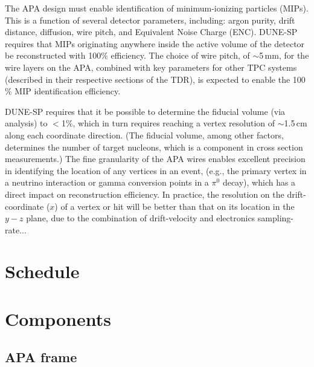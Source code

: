 The APA design must enable identification of minimum-ionizing particles (MIPs). This is a function of several detector parameters, including: argon purity, drift distance, diffusion, wire pitch, and Equivalent Noise Charge (ENC).  DUNE-SP requires that MIPs originating anywhere inside the active volume of the detector be reconstructed with 100$\%$ efficiency.   The choice of wire pitch, of $\sim$5\,mm, for the wire layers on the APA, combined with key parameters for other TPC systems (described in their respective sections of the TDR), is expected to enable the 100$\%$ MIP identification efficiency.

DUNE-SP requires that it be possible to determine the fiducial volume (via analysis) to $<$1$\%$, which in turn requires reaching a vertex resolution of $\sim$1.5\,cm along each coordinate direction. (The fiducial volume, among other factors, determines the number of target nucleons, which is a component in cross section measurements.) 
The fine granularity of the APA wires enables excellent precision in identifying the location of any vertices in an event, (e.g., the primary vertex in a neutrino interaction or gamma conversion points in a $\pi^{0}$ decay), which has a direct impact on reconstruction efficiency.
In practice, the resolution on the drift-coordinate ($x$) of a vertex or hit will be better than that on its location in the $y-z$ plane, due to the combination of drift-velocity and electronics sampling-rate...

\section{Schedule}
\label{apa:schedule}



\section{Components}
\label{sec:apa-components}



\subsection{APA frame}
\label{sec:apa-frame}

